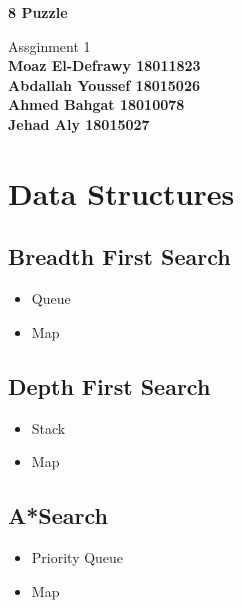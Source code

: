 \documentclass{article}
\begin{document}
   \begin{center}
       \vspace*{1cm}

	  \Huge
       \textbf{8 Puzzle}

	  \large
       \vspace{0.5cm}
        Assginment 1\\
       \vspace{5cm}
	   \LARGE
	   \textbf{Moaz El-Defrawy  \hspace*{\fill} 18011823} \\
       \textbf{Abdallah Youssef  \hspace*{\fill} 18015026} \\
       \textbf{Ahmed Bahgat \hspace*{\fill} 18010078} \\
       \textbf{Jehad Aly \hspace*{\fill} 18015027}
       
       
            
   \end{center}
   
\pagebreak

\section{Data Structures}
	\subsection{Breadth First Search}
		\begin{itemize}
			\item Queue
			\item Map
		\end{itemize}
	\subsection{Depth First Search}
		\begin{itemize}
			\item Stack
			\item Map
		\end{itemize}
	\subsection{A*Search}
		\begin{itemize}
			\item Priority Queue
			\item Map
		\end{itemize}
	
\end{document}
